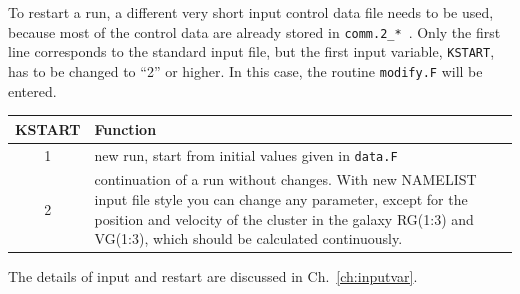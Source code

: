 To restart a run, a different very short input control data file
needs to be used, because most of the control data are already
stored in {\tt comm.2\_*}~. 
Only the first line corresponds to the standard input file,
but the first input variable, {\tt KSTART}, has to be changed
to ``2'' or higher.
In this case, the routine {\tt modify.F} will be entered.
%
\begin{center}
\begin{tabular}{|cp{10cm}|} \hline
{\bf KSTART} &  {\bf Function} \\  \hline
1      &  new run, start from initial values given in {\tt data.F}\\ \hline
2      &  continuation of a run without changes. With new NAMELIST input file style you can change any parameter, except for the position and velocity of the cluster in the galaxy RG(1:3) and VG(1:3), which should be calculated continuously. \\ \hline

\end{tabular}
\end{center}
%

The details of input and restart are discussed in Ch.~\ref{ch:inputvar}.

